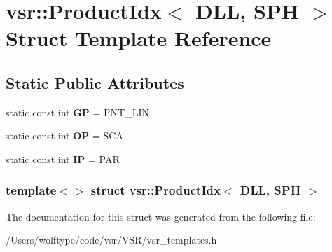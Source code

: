 \hypertarget{structvsr_1_1_product_idx_3_01_d_l_l_00_01_s_p_h_01_4}{\section{vsr\-:\-:Product\-Idx$<$ D\-L\-L, S\-P\-H $>$ Struct Template Reference}
\label{structvsr_1_1_product_idx_3_01_d_l_l_00_01_s_p_h_01_4}
}
\subsection*{Static Public Attributes}
\begin{DoxyCompactItemize}
\item 
\hypertarget{structvsr_1_1_product_idx_3_01_d_l_l_00_01_s_p_h_01_4_a7d47220dee1fee34e3ce59fe863a8b38}{static const int {\bfseries G\-P} = P\-N\-T\-\_\-\-L\-I\-N}\label{structvsr_1_1_product_idx_3_01_d_l_l_00_01_s_p_h_01_4_a7d47220dee1fee34e3ce59fe863a8b38}

\item 
\hypertarget{structvsr_1_1_product_idx_3_01_d_l_l_00_01_s_p_h_01_4_a61d6b820b00ddd21337473ae367332b8}{static const int {\bfseries O\-P} = S\-C\-A}\label{structvsr_1_1_product_idx_3_01_d_l_l_00_01_s_p_h_01_4_a61d6b820b00ddd21337473ae367332b8}

\item 
\hypertarget{structvsr_1_1_product_idx_3_01_d_l_l_00_01_s_p_h_01_4_ac3df761d1f465f0f66211a80b1e4564d}{static const int {\bfseries I\-P} = P\-A\-R}\label{structvsr_1_1_product_idx_3_01_d_l_l_00_01_s_p_h_01_4_ac3df761d1f465f0f66211a80b1e4564d}

\end{DoxyCompactItemize}
\subsubsection*{template$<$$>$ struct vsr\-::\-Product\-Idx$<$ D\-L\-L, S\-P\-H $>$}



The documentation for this struct was generated from the following file\-:\begin{DoxyCompactItemize}
\item 
/\-Users/wolftype/code/vsr/\-V\-S\-R/vsr\-\_\-templates.\-h\end{DoxyCompactItemize}

